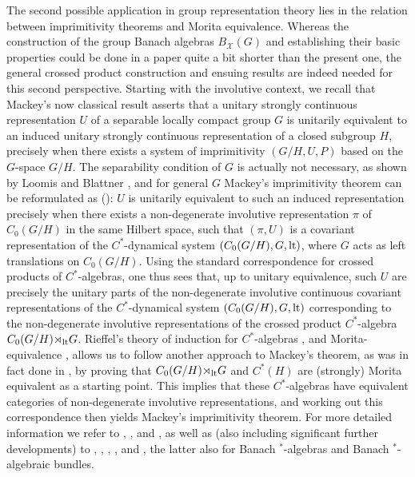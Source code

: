 \documentclass{amsart}
\theoremstyle{plain}
\theoremstyle{definition}
\numberwithin{equation}{section}
\begin{document}
The second possible application in group representation theory lies in the relation between imprimitivity theorems and Morita equivalence. Whereas the construction of the group Banach algebras $B_{\mathcal X}(G)$ and establishing their basic properties could be done in a paper quite a bit shorter than the present one, the general crossed product construction and ensuing results are indeed needed for this second perspective. Starting with the involutive context, we recall that Mackey's now classical result \cite{mackeyimprimitivity} asserts that a unitary strongly continuous representation $U$ of a separable locally compact group $G$ is unitarily equivalent to an induced unitary strongly continuous representation of a closed subgroup $H$, precisely when there exists a system of imprimitivity $(G/H,U,P)$ based on the $G$-space $G/H$. The separability condition of $G$ is actually not necessary, as shown by Loomis \cite{loomis} and Blattner \cite{blattner}, and for general $G$ Mackey's imprimitivity theorem
can be reformulated as (\cite[Theorem~7.18]{rieffelinducedadvances}): $U$ is unitarily equivalent to such an induced representation precisely when there exists a non-degenerate involutive representation $\pi$ of $C_0(G/H)$ in the same Hilbert space, such that $(\pi,U)$ is a covariant representation of the $C^*$-dynamical system $(C_0(G/H),G,\textup{lt})$, where $G$ acts as left translations on $C_0(G/H)$. Using the standard correspondence for crossed products of $C^*$-algebras, one thus sees that, up to unitary equivalence, such $U$ are precisely the unitary parts of the non-degenerate involutive continuous covariant representations of the $C^*$-dynamical system $(C_0(G/H),G,\textup{lt})$ corresponding to the non-degenerate involutive representations of the crossed product $C^*$-algebra $C_0(G/H){\rtimes}_{\textup{lt}}G$. Rieffel's theory of induction for $C^*$-algebras \cite{rieffelinducedbulletin}, \cite{rieffelinducedadvances} and Morita-equivalence \cite{rieffelmorita}, \cite{rieffelkingston} allows us to follow another approach to Mackey's theorem, as was in fact done in \cite{rieffelinducedadvances}, by proving that $C_0(G/H){\rtimes}_{\textup{lt}}G$ and $C^*(H)$ are (strongly) Morita equivalent as a starting point. This implies that these $C^*$-algebras have equivalent categories of non-degenerate involutive representations, and working out this correspondence then yields Mackey's imprimitivity theorem. For more detailed information we refer to \cite{rieffelinducedadvances}, \cite{rieffelmorita}, and \cite{rieffelkingston}, as well as (also including significant further developments) to \cite{green}, \cite{mansfield}, \cite{raeburnwilliams}, \cite{echterhoffetal}, \cite{williams} and \cite{fellanddoran}, the latter also for Banach $^*$-algebras and Banach $^*$-algebraic bundles.
\end{document}

